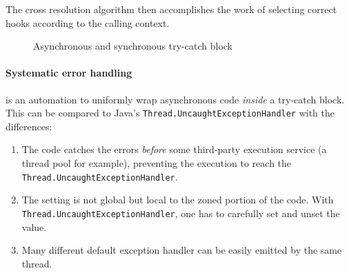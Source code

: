 The cross resolution algorithm then accomplishes the work of selecting correct hooks according to the calling context.

\begin{figure}[H]
\centering
{}
\caption{Asynchronous and synchronous try-catch block}
\label{fig:sas-tc}
\end{figure}

\paragraph{Systematic error handling} is an automation to uniformly wrap asynchronous code \emph{inside} a try-catch block. This can be compared to Java's \lstinline{Thread.UncaughtExceptionHandler} with the differences:

\begin{enumerate}
\item The code catches the errors \emph{before} some third-party execution service (a thread pool for example), preventing the execution to reach the \lstinline{Thread.UncaughtExceptionHandler}.
\item The setting is not global but local to the zoned portion of the code. With \lstinline{Thread.UncaughtExceptionHandler}, one has to carefully set and unset the value.
\item Many different default exception handler can be easily emitted by the same thread.
\end{enumerate}

